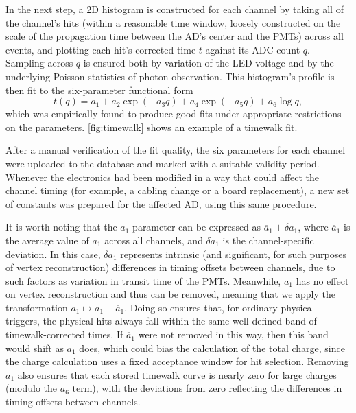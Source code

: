 \documentclass[../thesis.tex]{subfiles}
\begin{document}
In the next step, a 2D histogram is constructed for each channel by taking all of the channel's hits (within a reasonable time window, loosely constructed on the scale of the propagation time between the AD's center and the PMTs) across all events, and plotting each hit's corrected time $t$ against its ADC count $q$. Sampling across $q$ is ensured both by variation of the LED voltage and by the underlying Poisson statistics of photon observation. This histogram's profile is then fit to the six-parameter functional form
\begin{equation}
  t(q) = a_1 + a_2 \exp (-a_3 q) + a_4 \exp (-a_5 q) + a_6 \log q,
  \label{eq:calibTimewalk}
\end{equation}
which was empirically found to produce good fits under appropriate restrictions on the parameters. \autoref{fig:timewalk} shows an example of a timewalk fit.

After a manual verification of the fit quality, the six parameters for each channel were uploaded to the database and marked with a suitable validity period. Whenever the electronics had been modified in a way that could affect the channel timing (for example, a cabling change or a board replacement), a new set of constants was prepared for the affected AD, using this same procedure.

It is worth noting that the $a_1$ parameter can be expressed as $\overline a_1 + \delta a_1$, where $\overline a_1$ is the average value of $a_1$ across all channels, and $\delta a_1$ is the channel-specific deviation. In this case, $\delta a_1$ represents intrinsic (and significant, for such purposes of vertex reconstruction) differences in timing offsets between channels, due to such factors as variation in transit time of the PMTs. Meanwhile, $\overline a_1$ has no effect on vertex reconstruction and thus can be removed, meaning that we apply the transformation $a_1 \mapsto a_1 - \overline a_1$. Doing so ensures that, for ordinary physical triggers, the physical hits always fall within the same well-defined band of timewalk-corrected times. If $\overline a_1$ were not removed in this way, then this band would shift as $\overline a_1$ does, which could bias the calculation of the total charge, since the charge calculation uses a fixed acceptance window for hit selection. Removing $\overline a_1$ also ensures that each stored timewalk curve is nearly zero for large charges (modulo the $a_6$ term), with the deviations from zero reflecting the differences in timing offsets between channels.
\end{document}
